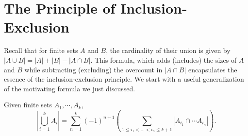 \section{The Principle of Inclusion-Exclusion}
Recall that for finite sets $A$ and $B$, the cardinality of their union is given by $|A \cup B| = |A| + |B| - |A \cap B|
$. This formula, which adds (includes) the sizes of $A$ and $B$ while subtracting (excluding) the overcount in $|A \cap B|$ encapsulates the essence of the inclusion-exclusion principle. We start with a useful generalization of the motivating formula we just discussed.
\begin{theorem}
	Given finite sets $A_{1},\cdots,A_{k}$, 
	\[
		|\bigcup_{i=1}^k A_i| = \sum_{n=1}^{k}\left(-1  \right)^{n+1}\left( \sum_{1\leq i_{1}<\ldots<i_{n}\leq k+1}|A_{i_{1}}\cap \cdots A_{i_{n}}| \right) 
	.\] 
\end{theorem}

